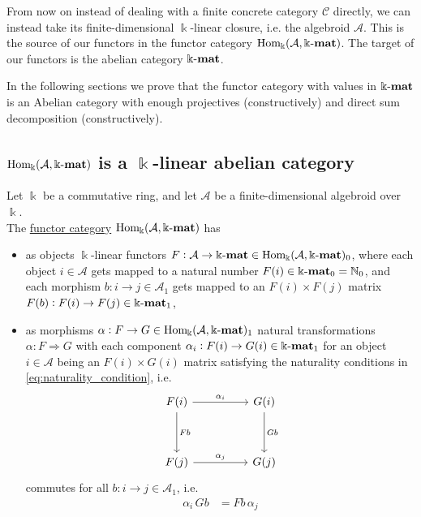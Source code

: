 \label{sect:abelian_cat}
From now on instead of dealing with a finite concrete category $\mathcal{C}$ directly, we can instead take its finite-dimensional $\Bbbk$-linear
closure, i.e. the algebroid $\mathcal{A}$. This is the source of our functors in the functor category $\mathrm{Hom_{\Bbbk}}(\mathcal{A},\Bbbk\textnormal{-}\mathbf{mat})$. The target of
our functors is the abelian category $\Bbbk\textnormal{-}\mathbf{mat}$.

In the following sections we prove that the functor category with values in $\Bbbk\textnormal{-}\mathbf{mat}$ is an Abelian category with enough
projectives (constructively) and direct sum decomposition (constructively).

\subsection{$\mathrm{Hom_{\Bbbk}}(\mathcal{A},\Bbbk\textnormal{-}\mathbf{mat})$ is a $\Bbbk$-linear abelian category}

\begin{definition}
Let $\Bbbk$ be a commutative ring, and let $\mathcal{A}$ be a finite-dimensional algebroid over $\Bbbk$.\\
The \ul{functor category} $\mathrm{Hom_{\Bbbk}}(\mathcal{A},\Bbbk\textnormal{-}\mathbf{mat})$ has
\begin{itemize}
\item as objects $\Bbbk$-linear functors $F : \mathcal{A} \rightarrow \Bbbk\textnormal{-}\mathbf{mat} \in \mathrm{Hom_{\Bbbk}}(\mathcal{A},\Bbbk\textnormal{-}\mathbf{mat})_{0}$, where each
object $i \in \mathcal{A}$ gets mapped to a natural number $F(i) \in \Bbbk\textnormal{-}\mathbf{mat}_{0} = \mathbb{N}_{0}$, and each
morphism $b : i \rightarrow j \in \mathcal{A}_{1}$ gets mapped to an $F(i) \times F(j)$ matrix
$F(b) : F(i) \rightarrow F(j) \in \Bbbk\textnormal{-}\mathbf{mat}_{1}$,
\item as morphisms $\alpha : F \rightarrow G \in \mathrm{Hom_{\Bbbk}}(\mathcal{A},\Bbbk\textnormal{-}\mathbf{mat})_{1}$ natural transformations $\alpha : F \Rightarrow G$ with each component
$\alpha_{i} : F(i) \rightarrow G(i) \in \Bbbk\textnormal{-}\mathbf{mat}_{1}$ for an object $i \in \mathcal{A}$ being an $F(i) \times G(i)$ matrix satisfying the
naturality conditions in \eqref{eq:naturality_condition}, i.e.
\[
\begin{tikzcd}
F(i) \arrow[rr, "\alpha_{i}"] \arrow[dd, "Fb"] &  & G(i) \arrow[dd, "Gb"] \\
                                             &  &                     \\
F(j) \arrow[rr, "\alpha_{j}"]                &  & G(j)                
\end{tikzcd}
\]
commutes for all $b : i \rightarrow j \in \mathcal{A}_{1}$, i.e.
\begin{align}
\alpha_{i}\,Gb &= Fb\,\alpha_{j}
\end{align}
\end{itemize}
\end{definition}

